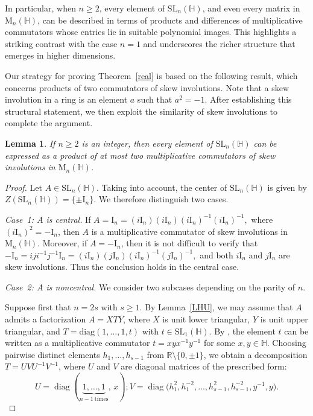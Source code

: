 \documentclass[11pt]{article}
\newtheorem{lemma}[theorem]{Lemma}
\theoremstyle{definition}
\begin{document}
{{{{				In particular, when $n \geq 2$, every element of $\mathrm{SL}_n(\mathbb{H})$, and even every matrix in $\mathrm{M}_n(\mathbb{H})$, can be described in terms of products and differences of multiplicative commutators whose entries lie in suitable polynomial images. This highlights a striking contrast with the case $n = 1$ and underscores the richer structure that emerges in higher dimensions.
				
				Our strategy for proving Theorem~\ref{real} is based on the following result, which concerns products of two commutators of skew involutions. Note that a skew involution in a ring is an element $a$ such that $a^2 = -1$.
				After establishing this structural statement, we then exploit the similarity of skew involutions to complete the argument.
				
				
				
				\begin{lemma}\label{skew}
					If $n\geq2$ is an integer, then every element of
					$\mathrm{SL}_n(\mathbb H)$ can be expressed as a product of at most two multiplicative
					commutators of skew involutions in $\mathrm{M}_n(\mathbb H)$.
				\end{lemma}
				
				\begin{proof}
					Let $A \in \mathrm{SL}_n(\mathbb H)$. Taking \cite[Lemma~16]{Pa_Ha_Nam_Son} into account, the center of
					$\mathrm{SL}_n(\mathbb H)$ is given by
					$Z(\mathrm{SL}_n(\mathbb H))=\{\pm \mathrm I_n\}.$
					We therefore distinguish two cases.
					
					\medskip
					\noindent
					\textit{Case~1: $A$ is central.}
					If $A=\mathrm I_n=(i\mathrm I_n)(i\mathrm I_n)(i\mathrm I_n)^{-1}(i\mathrm I_n)^{-1},$
					where $(i\mathrm I_n)^2=-\mathrm I_n$, then $A$ is a multiplicative commutator of skew involutions in
					$\mathrm{M}_n(\mathbb H)$. Moreover,
					if $A=-\mathrm I_n$, then it is not difficult to verify that
					$-\mathrm I_n
					=iji^{-1}j^{-1}\mathrm I_n
					=(i\mathrm I_n)(j\mathrm I_n)(i\mathrm I_n)^{-1}(j\mathrm I_n)^{-1},$
					and both $i\mathrm I_n$ and $j\mathrm I_n$ are skew involutions. Thus the conclusion
					holds in the central case.
					
					\medskip
					\noindent
					\textit{Case~2: $A$ is noncentral.}
					We consider two subcases depending on the parity of $n$.
					
					Suppose first that $n=2s$ with $s\ge1$. By Lemma~\ref{LHU}, we may
					assume that $A$ admits a factorization $A=XTY$, where $X$ is unit lower triangular,
					$Y$ is unit upper triangular, and
					$T=\mathrm{diag}(1,\ldots,1,t)$ with $t\in\mathrm{SL}_1(\mathbb{H})$.
					By \cite[Lemma~2.5]{Pa_BiDuHa}, the element $t$ can be written as a multiplicative
					commutator $t=xyx^{-1}y^{-1}$ for some $x,y\in\mathbb{H}$.
					Choosing pairwise distinct elements $h_1,\ldots,h_{s-1}$ from
					$\mathbb R\setminus\{0,\pm1\}$, we obtain a decomposition
					$T=UVU^{-1}V^{-1}$, where $U$ and $V$ are diagonal matrices of the prescribed form: $$ U = \operatorname{diag}(\underbrace{1,\ldots,1}_{n-1\ \text{times}},\, x); V = \operatorname{diag}\bigl(
					h_1^{2}, h_1^{-2},
					\ldots,
					h_{s-1}^{2}, h_{s-1}^{-2},
					y^{-1}, y
					\bigr).$$
					

\end{proof}}}}}
\end{document}
